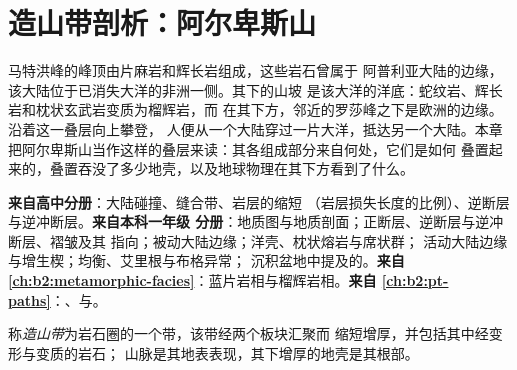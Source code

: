 \chapter{造山带剖析：阿尔卑斯山}\label{ch:b2:alpine-orogen}

马特洪峰的峰顶由片麻岩和辉长岩组成，这些岩石曾属于
阿普利亚大陆的边缘，该大陆位于已消失大洋的非洲一侧。其下的山坡
是该大洋的洋底：蛇纹岩、辉长岩和枕状玄武岩变质为榴辉岩，而
在其下方，邻近的罗莎峰之下是欧洲的边缘。沿着这一叠层向上攀登，
人便从一个大陆穿过一片大洋，抵达另一个大陆。本章把阿尔卑斯山当作这样的叠层来读：其各组成部分来自何处，它们是如何
叠置起来的，叠置吞没了多少地壳，以及地球物理在其下方看到了什么。

\begin{recall}
\textbf{来自高中分册}：大陆碰撞、缝合带、岩层的缩短
（岩层损失长度的比例）、逆断层与逆冲断层。\textbf{来自本科一年级
分册}：地质图与地质剖面；正断层、逆断层与逆冲断层、褶皱及其
指向；被动大陆边缘；洋壳、枕状熔岩与席状群；
活动大陆边缘与增生楔；均衡、艾里根与布格异常；
沉积盆地中提及的。\textbf{来自
\cref{ch:b2:metamorphic-facies}}：蓝片岩相与榴辉岩相。\textbf{来自
\cref{ch:b2:pt-paths}}：、与。
\end{recall}

\begin{definition}[造山带]\label{def:b2:alpine-orogen:orogen}
称\emph{造山带}为岩石圈的一个带，该带经两个板块汇聚而
缩短增厚，并包括其中经变形与变质的岩石；
山脉是其地表表现，其下增厚的地壳是其根部。
\end{definition}

